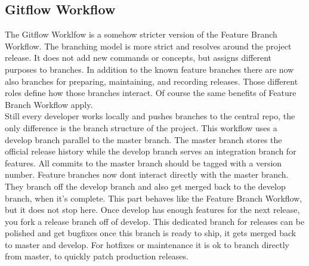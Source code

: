 \subsection{Gitflow Workflow}
The Gitflow Worklfow is a somehow stricter version of the Feature Branch Workflow. The branching model is more strict and resolves around the project release.
It does not add new commands or concepts, but assigns different purposes to branches. In addition to the known feature branches there are now also branches 
for preparing, maintaining, and recording releases. Those different roles define how those branches interact. Of course the same benefits of Feature Branch Workflow apply.
\\
Still every developer works locally and pushes branches to the central repo, the only difference is the branch structure of the project.
This workflow uses a develop branch parallel to the master branch. The master branch stores the official release history while the develop branch serves an integration branch for features.
All commits to the master branch should be tagged with a version number.
Feature branches now dont interact directly with the master branch. They branch off the develop branch and also get merged back to the develop branch, when it's complete.
This part behaves like the Feature Branch Workflow, but it does not stop here.
Once develop has enough features for the next release, you fork a release branch off of develop. This dedicated branch for releases can be polished and get bugfixes 
once this branch is ready to ship, it gets merged back to master and develop. For hotfixes or maintenance it is ok to branch directly from master, to quickly patch production releases.






